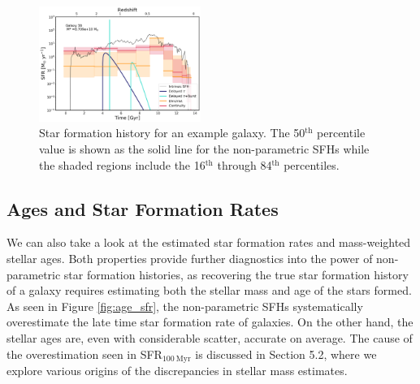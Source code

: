 \documentclass[twocolumn]{aastex62}
\begin{document}
\begin{figure}[h]

\centering
\includegraphics[width=0.47\textwidth]{SFH_38.png}

\caption{Star formation history for an example galaxy. The 50$^{\mathrm{th}}$ percentile value is shown as the solid line for the non-parametric SFHs while the shaded regions include the 16$^{\mathrm{th}}$ through 84$^{\mathrm{th}}$ percentiles.}
\label{fig:sfh}

\end{figure}



\subsection{Ages and Star Formation Rates}

We can also take a look at the estimated star formation rates and mass-weighted stellar ages. Both properties provide further diagnostics into the power of non-parametric star formation histories, as recovering the true star formation history of a galaxy requires estimating both the stellar mass and age of the stars formed. As seen in Figure \ref{fig:age_sfr}, the non-parametric SFHs systematically overestimate the late time star formation rate of galaxies. On the other hand, the stellar ages are, even with considerable scatter, accurate on average. The cause of the overestimation seen in SFR$_{100 \: \mathrm{Myr}}$ is discussed in Section 5.2, where we explore various origins of the discrepancies in stellar mass estimates.
\end{document}

